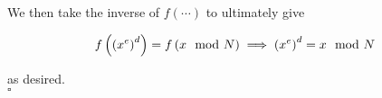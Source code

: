 \documentclass[../CryptoHW3.tex]{subfiles}
\begin{document}
\begin{flushleft}
We then take the inverse of $f \left( \cdots \right)$ to ultimately give

\begin{align}
  f \left( \left( x^e \right)^d \right) = f \left( x \mod N \right) \; \Longrightarrow \; \left( x^e \right)^d = x \mod N  \notag
\end{align}

as desired. \\
$\square$






\end{flushleft}
\end{document}
